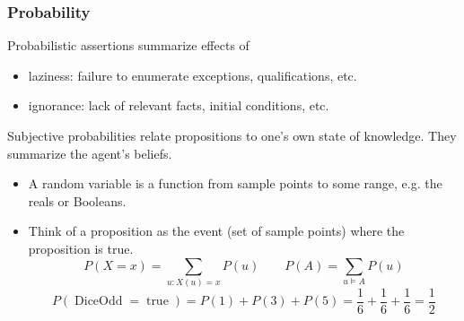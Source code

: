 \documentclass[UTF8,11pt,colorlinks,compress,openany]{beamer}%
\begin{document}
\begin{frame}\frametitle{Probability}
Probabilistic assertions summarize effects of
\begin{itemize}
	\item laziness: failure to enumerate exceptions, qualifications, etc.
	\item ignorance: lack of relevant facts, initial conditions, etc.
\end{itemize}
Subjective probabilities relate propositions to one's own state of knowledge. They summarize the agent's beliefs.\\
\begin{itemize}
	\item A random variable is a function from sample points to some range, e.g. the reals or Booleans.
	\item Think of a proposition as the event (set of sample points) where the proposition is true.
\[P(X=x)=\sum\limits_{u:X(u)=x}P(u)\qquad P(A)=\sum\limits_{u\vDash A}P(u)\]
\[P(\operatorname{DiceOdd}=\operatorname{true})=P(1)+P(3)+P(5)=\frac{1}{6}+\frac{1}{6}+\frac{1}{6}=\frac{1}{2}\]
\end{itemize}
\end{frame}
\end{document}
